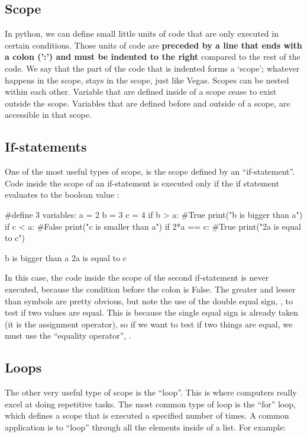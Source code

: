 \subsection{Scope}
In python, we can define small little units of code that are only executed in certain conditions. Those units of code are \textbf{preceded by a line that ends with a colon (':') and must be indented to the right} compared to the rest of the code. We say that the part of the code that is indented forms a `scope';  whatever happens in the scope, stays in the scope, just like Vegas. Scopes can be nested within each other. Variable that are defined inside of a scope cease to exist outside the scope. Variables that are defined before and outside of a scope, are accessible in that scope. 

\subsection{If-statements}
One of the most useful types of scope, is the scope defined by an ``if-statement''. Code inside the scope of an if-statement is executed only if the if statement evaluates to the boolean value :
\begin{python}[caption = If statements]
#define 3 variables:
a = 2 
b = 3
c = 4
if b > a: #True
  print("b is bigger than a")
if c < a: #False
  print("c is smaller than a")
if 2*a == c: #True
  print("2a is equal to c")
\end{python}
\begin{poutput}
b is bigger than a
2a is equal to c
\end{poutput}
In this case, the code inside the scope of the second if-statement is never executed, because the condition before the colon is False. The greater and lesser than symbols are pretty obvious, but note the use of the double equal sign, \code{==}, to test if two values are equal. This is because the single equal sign is already taken (it is the assignment operator), so if we want to test if two things are equal, we must use the ``equality operator'', \code{==}.

\subsection{Loops}
The other very useful type of scope is the ``loop''. This is where computers really excel at doing repetitive tasks. The most common type of loop is the ``for'' loop, which defines a scope that is executed a specified number of times. A common application is to ``loop'' through all the elements inside of a list. For example:

